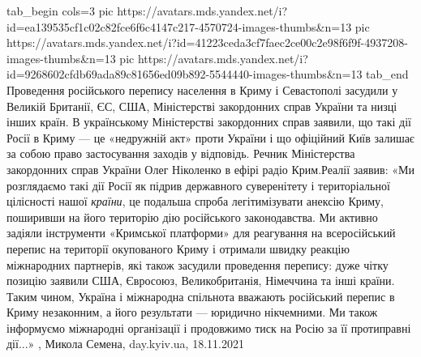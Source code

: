 \ifcmt
  tab_begin cols=3
     pic https://avatars.mds.yandex.net/i?id=ea139535cf1c02c82fce6f6c4147c217-4570724-images-thumbs&n=13
     pic https://avatars.mds.yandex.net/i?id=41223ceda3cf7faec2ce00c2e98f6f9f-4937208-images-thumbs&n=13
		 pic https://avatars.mds.yandex.net/i?id=9268602cfdb69ada89c81656ed09b892-5544440-images-thumbs&n=13
  tab_end
\fi
Проведення російського перепису населення в Криму і Севастополі засудили у
Великій Британії, ЄС, США, Міністерстві закордонних справ України та низці
інших країн. В українському Міністерстві закордонних справ заявили, що такі дії
Росії в Криму — це «недружній акт» проти України і що офіційний Київ залишає за
собою право застосування заходів у відповідь.  Речник Міністерства закордонних
справ України Олег Ніколенко в ефірі радіо Крим.Реалії заявив: «Ми розглядаємо
такі дії Росії як підрив державного суверенітету і територіальної цілісності
нашої \emph{країни}, це подальша спроба легітимізувати анексію Криму, поширивши
на його територію дію російського законодавства. Ми активно задіяли інструменти
«Кримської платформи» для реагування на всеросійський перепис на території
окупованого Криму і отримали швидку реакцію міжнародних партнерів, які також
засудили проведення перепису: дуже чітку позицію заявили США, Євросоюз,
Великобританія, Німеччина та інші країни. Таким чином, Україна і міжнародна
спільнота вважають російський перепис в Криму незаконним, а його результати —
юридично нікчемними. Ми також інформуємо міжнародні організації і продовжимо
тиск на Росію за її протиправні дії...»
, 
Микола Семена, day.kyiv.ua, 18.11.2021
